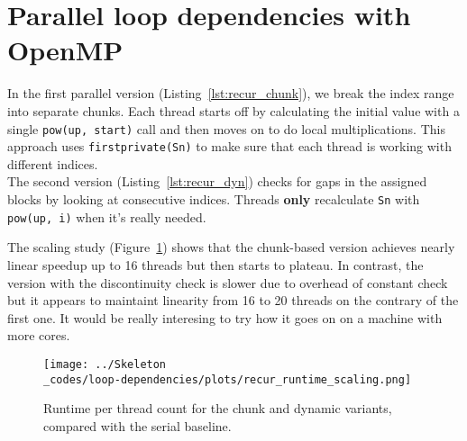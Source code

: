 \section{Parallel loop dependencies with OpenMP }

In the first parallel version (Listing~\ref{lst:recur_chunk}), we break the index range into separate chunks. Each thread starts off by calculating the initial value with a single \texttt{pow(up, start)} call and then moves on to do local multiplications. This approach uses \texttt{firstprivate(Sn)} to make sure that each thread is working with different indices. \\

The second version (Listing~\ref{lst:recur_dyn}) checks for gaps in the assigned blocks by looking at consecutive indices. Threads \textbf{only} recalculate \texttt{Sn} with \texttt{pow(up, i)} when it's really needed.





The scaling study (Figure~\ref{fig:recur_scaling}) shows that the chunk-based version achieves nearly linear speedup up to 16 threads but then starts to plateau. In contrast, the version with the discontinuity check is slower due to overhead of constant check but it appears to maintaint linearity from 16 to 20 threads on the contrary of the first one. It would be really interesing to try how it goes on on  a machine with more cores.

\begin{figure}[H]
    \centering
    \texttt{[image: ../Skeleton\\\_codes/loop-dependencies/plots/recur\_runtime\_scaling.png]}
    \caption{Runtime per thread count for the chunk and dynamic variants, compared with the serial baseline.}
    \label{fig:recur_scaling}
\end{figure}
